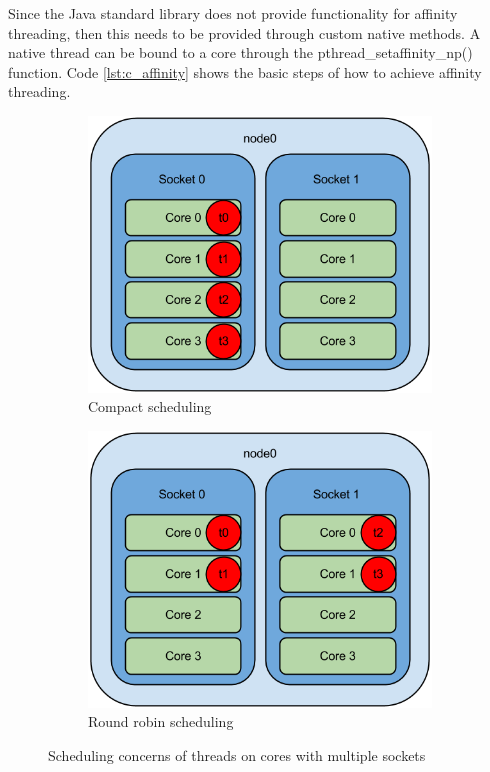 \documentclass[final_report.tex]{subfiles}
\begin{document}
Since the Java standard library does not provide functionality for affinity threading, then this needs to be provided through custom native methods. A native thread can be bound to a core through the pthread\_setaffinity\_np() function. Code \ref{lst:c_affinity} shows the basic steps of how to achieve affinity threading.

\begin{figure}[H]
	\centering
	\begin{subfigure}{0.5\textwidth}
		\includegraphics[width=\textwidth]{img/aff1.png}
		\caption{Compact scheduling}
		\label{fig:aff1}
	\end{subfigure}%
	\begin{subfigure}{0.5\textwidth}
		\includegraphics[width=\textwidth]{img/aff2.png}
		\caption{Round robin scheduling}
		\label{fig:aff2}
	\end{subfigure}
	\caption{Scheduling concerns of threads on cores with multiple sockets}
	\label{fig:aff}
\end{figure}
\end{document}
